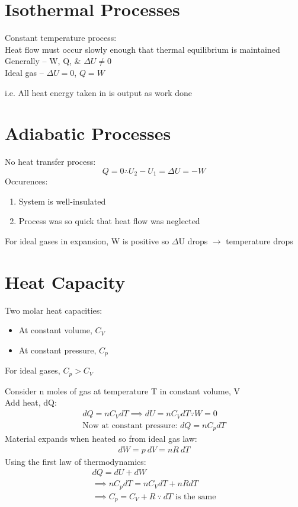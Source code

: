 \documentclass[a4paper, 11pt, normalem]{report}
\begin{document}
\section{Isothermal Processes}
Constant temperature process: \\
Heat flow must occur slowly enough that thermal equilibrium is maintained \\
Generally -- W, Q, \& ${\Delta}U \neq 0$ \\
Ideal gas -- ${\Delta}U = 0$, $Q = W$

i.e. All heat energy taken in is output as work done

\section{Adiabatic Processes}
No heat transfer process:
\vspace{-10pt}
\begin{equation*}
	Q = 0 \therefore U_{2} - U_{1} = {\Delta}U = -W
\end{equation*}
Occurences:
\begin{enumerate}
	\item System is well-insulated
	\item Process was so quick that heat flow was neglected
\end{enumerate}
For ideal gases in expansion, W is positive so $\Delta$U drops $\rightarrow$ temperature drops

\section{Heat Capacity}
Two molar heat capacities:
\begin{itemize}
	\item[] At constant volume, $C_{V}$
	\item[] At constant pressure, $C_{p}$
\end{itemize}
For ideal gases, $C_{p} > C_{V}$

Consider n moles of gas at temperature T in constant volume, V \\
Add heat, dQ:
\begin{gather*}
	dQ = nC_{V}dT \implies dU = nC_{V}dT \because W = 0 \\
	\text{Now at constant pressure: } dQ = nC_{p}dT
\end{gather*}
Material expands when heated so from ideal gas law:
\begin{gather*}
	dW = p\:dV = nR\:dT
\end{gather*}
Using the first law of thermodynamics:
\begin{gather*}
	dQ = dU + dW \\
	\implies nC_{p}dT = nC_{V}dT + nRdT \\
	\implies C_{p} = C_{V} + R ~\because~ dT \text{ is the same}
\end{gather*}
\end{document}
